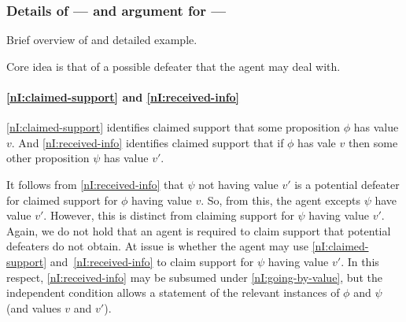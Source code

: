 \subsubsection{Details of --- and argument for --- \nI{}}
\label{sec:details-ni}

\begin{note}[Overview]
  Brief overview of \nI{} and detailed example.

  Core idea is that of a possible defeater that the agent may deal with.
\end{note}

\paragraph{\ref{nI:claimed-support} and \ref{nI:received-info}}

\begin{note}
  \ref{nI:claimed-support} identifies claimed support that some proposition \(\phi\) has value \(v\).
  And \ref{nI:received-info} identifies claimed support that if \(\phi\) has vale \(v\) then some other proposition \(\psi\) has value \(v'\).

  It follows from \ref{nI:received-info} that \(\psi\) not having value \(v'\) is a potential defeater for claimed support for \(\phi\) having value \(v\).
  So, from this, the agent excepts \(\psi\) have value \(v'\).
  However, this is distinct from claiming support for \(\psi\) having value \(v'\).
  Again, we do not hold that an agent is required to claim support that potential defeaters do not obtain.
  At issue is whether the agent may use \ref{nI:claimed-support} and~\ref{nI:received-info} to claim support for \(\psi\) having value \(v'\).
  In this respect, \ref{nI:received-info} may be subsumed under \ref{nI:going-by-value}, but the independent condition allows a statement of the relevant instances of \(\phi\) and \(\psi\) (and values \(v\) and \(v'\)).

\end{note}


